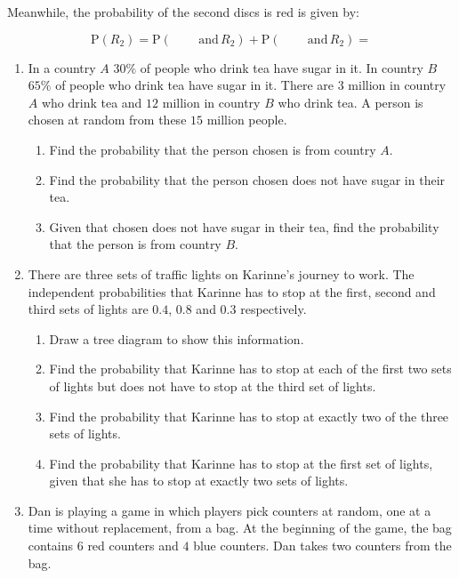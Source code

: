 Meanwhile, the probability of the second discs is red is given by:

\[
\text{P}(R_2) = \text{P}(\qquad \,\text{and}\, R_2) + \text{P}(\qquad \,\text{and}\, R_2) = 
\]


\exercise %
 
\begin{enumerate}
	\item In a country $A$ $30\%$ of people who drink tea have sugar in it. In country $B$ $65\%$ of people who drink tea have sugar in it. There are $3$ million in country $A$ who drink tea and $12$ million in country $B$ who drink tea.  A person is chosen at random from these $15$ million people.
	\begin{enumerate}
		\item Find the probability that the person chosen is from country $A$.
		\item Find the probability that the person chosen does not have sugar in their tea.
		\item Given that chosen does not have sugar in their tea, find the probability that the person is from country $B$.
	\end{enumerate}
	
	\item  There are three sets of traffic lights on Karinne's journey to work. The independent probabilities that Karinne has to stop at the first, second and third sets of lights are $0.4$, $0.8$ and $0.3$ respectively.
	\begin{enumerate}
		\item Draw a tree diagram to show this information.
		\item Find the probability that Karinne has to stop at each of the first two sets of lights but does not have to stop at the third set of lights.
		\item Find the probability that Karinne has to stop at exactly two of the three sets of lights.
		\item Find the probability that Karinne has to stop at the first set of lights, given that she has to stop at exactly two sets of lights.
	\end{enumerate}

\item Dan is playing a game in which players pick counters at random, one at a time without replacement, from a bag. At the beginning of the game, the bag contains $6$ red counters and $4$ blue counters. Dan takes two counters from the bag.


\end{enumerate}
